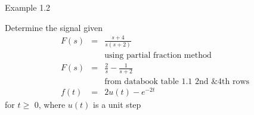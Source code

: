 \documentclass[11pt]{article} %
\begin{document}
	Example 1.2

	Determine the signal given
		\begin{eqnarray}
			F(s) &=& \frac{s+4}{s(s+2)} \nonumber \\
			&&\mbox{using partial fraction method} \nonumber \\
			F(s) &=& \frac{2}{s} - \frac{1}{s+2} \nonumber \\
			&&\mbox{from databook table 1.1 2nd \& 4th rows} \nonumber \\
			f(t)&=&2u(t)-e^{-2t}
		\end{eqnarray}
		for $t\ge$ 0, where $u(t)$ is a unit step

	\begin{figure}[h]
		\centering
		\caption{}
	\end{figure}
\end{document}
